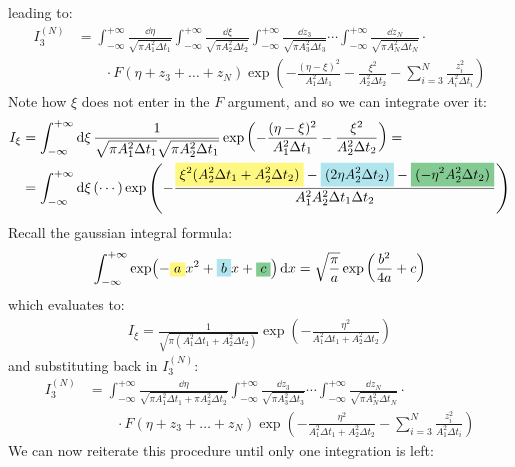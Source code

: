 \documentclass[../template.tex]{subfiles}
\begin{document}
leading to:
\begin{align*}
    I_3^{(N)} &= \int_{-\infty}^{+\infty} \frac{\dd{\eta}}{\sqrt{ \pi A_1^2 \Delta t_1}}\int_{-\infty}^{+\infty} \frac{\dd{\xi}}{\sqrt{ \pi A_2^2 \Delta t_2 }} \int_{-\infty}^{+\infty} \frac{\dd{z_3}}{\sqrt{\pi A_3^2 \Delta t_3}}\cdots \int_{-\infty}^{+\infty} \frac{\dd{z_N}}{\sqrt{\pi A_N^2 \Delta t_N}} \cdot\\
    &\qquad \cdot F(\eta + z_3 + \dots + z_N) \exp\left(-\frac{(\eta-\xi)^2}{A_1^2 \Delta t_1} - \frac{\xi^2}{A_2^2 \Delta t_2} - \sum_{i=3}^N \frac{z_i^2}{A_i^2 \Delta t_i} \right)
\end{align*}
Note how $\xi$ does not enter in the $F$ argument, and so we can integrate over it:
\begin{align*}
    I_\xi &= \int_{-\infty}^{+\infty} \dd{\xi} \frac{1}{\sqrt{\pi A_1^2 \Delta t_1} \sqrt{\pi A_2^2 \Delta t_1 }}\exp\left(-\frac{(\eta - \xi)^2}{A_1^2 \Delta t_1} - \frac{\xi^2}{A_2^2 \Delta t_2} \right) =\\
    &= \int_{-\infty}^{+\infty} \dd{\xi} (\cdots) \exp\left(-\frac{\hlc{Yellow}{\xi^2 (A_2^2 \Delta t_1 + A_2^2 \Delta t_2)} - \hlc{SkyBlue}{(2\eta A_2^2 \Delta t_2)} - \hlc{ForestGreen}{(-\eta^2 A_2^2 \Delta t_2)}}{A_1^2 A_2^2 \Delta t_1 \Delta t_2} \right)
\end{align*}  
Recall the gaussian integral formula:
\begin{align}
    \int_{-\infty}^{+\infty} \exp(-\hlc{Yellow}{a}x^2 +\hlc{SkyBlue}{ b}x + \hlc{ForestGreen}{c}) \dd{x} = \sqrt{\frac{\pi}{a} } \exp\left(\frac{b^2}{4a} + c \right)\label{eqn:gauss-int}
\end{align}
which evaluates to:
\begin{align*}
    I_\xi = \frac{1}{\sqrt{\pi (A_1^2 \Delta t_1 + A_2^2 \Delta t_2)}} \exp\left(-\frac{\eta^2}{A_1^2 \Delta t_1 + A_2^2 \Delta t_2} \right) 
\end{align*}
and substituting back in $I_3^{(N)}$:
\begin{align*}
    I_3^{(N)} &= \int_{-\infty}^{+\infty} \frac{\dd{\eta}}{\sqrt{\pi A_1^2 \Delta t_1 + \pi A_2^2 \Delta t_2}} \int_{-\infty}^{+\infty} \frac{\dd{z_3}}{\sqrt{ \pi A_3^2 \Delta t_3}} \cdots \int_{-\infty}^{+\infty} \frac{\dd{z_N}}{\sqrt{\pi A_N^2 \Delta t_N }} \cdot  \\
    &\qquad \cdot F(\eta + z_3 + \dots + z_N) \exp\left(-\frac{\eta^2}{A_1^2 \Delta t_1 + A_2^2 \Delta t_2} - \sum_{i=3}^N \frac{z_i^2}{A_1^2 \Delta t_i} \right)
\end{align*} 
We can now reiterate this procedure until only one integration is left:
\end{document}
